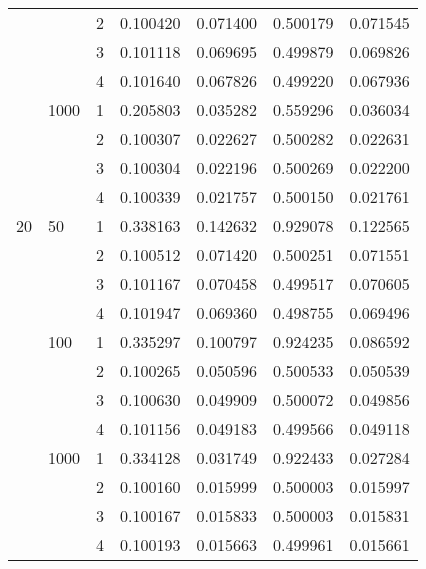 \begin{tabular}{lllrrrr}
   &      & 2 &        0.100420 &           0.071400 &       0.500179 &           0.071545 \\
   &      & 3 &        0.101118 &           0.069695 &       0.499879 &           0.069826 \\
   &      & 4 &        0.101640 &           0.067826 &       0.499220 &           0.067936 \\
   & 1000 & 1 &        0.205803 &           0.035282 &       0.559296 &           0.036034 \\
   &      & 2 &        0.100307 &           0.022627 &       0.500282 &           0.022631 \\
   &      & 3 &        0.100304 &           0.022196 &       0.500269 &           0.022200 \\
   &      & 4 &        0.100339 &           0.021757 &       0.500150 &           0.021761 \\
20 & 50   & 1 &        0.338163 &           0.142632 &       0.929078 &           0.122565 \\
   &      & 2 &        0.100512 &           0.071420 &       0.500251 &           0.071551 \\
   &      & 3 &        0.101167 &           0.070458 &       0.499517 &           0.070605 \\
   &      & 4 &        0.101947 &           0.069360 &       0.498755 &           0.069496 \\
   & 100  & 1 &        0.335297 &           0.100797 &       0.924235 &           0.086592 \\
   &      & 2 &        0.100265 &           0.050596 &       0.500533 &           0.050539 \\
   &      & 3 &        0.100630 &           0.049909 &       0.500072 &           0.049856 \\
   &      & 4 &        0.101156 &           0.049183 &       0.499566 &           0.049118 \\
   & 1000 & 1 &        0.334128 &           0.031749 &       0.922433 &           0.027284 \\
   &      & 2 &        0.100160 &           0.015999 &       0.500003 &           0.015997 \\
   &      & 3 &        0.100167 &           0.015833 &       0.500003 &           0.015831 \\
   &      & 4 &        0.100193 &           0.015663 &       0.499961 &           0.015661 \\
\bottomrule
\end{tabular}
